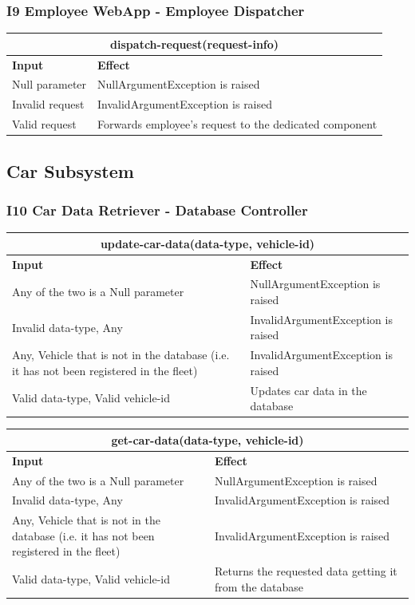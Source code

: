 \documentclass{article}
\begin{document}
\subsubsection{I9 Employee WebApp - Employee Dispatcher}
\begin{tabular}{ |p{5cm}|p{7cm}| }
  \hline
  \multicolumn{2}{|c|}{dispatch-request(request-info)} \\
  \hline
  \textbf{Input} & \textbf{Effect} \\
  \hline
  Null parameter & NullArgumentException is raised\\
  \hline
  Invalid request & InvalidArgumentException is raised \\
  \hline
  Valid request & Forwards employee's request to the dedicated component\\
  \hline
\end{tabular}
\newpage
\subsection{Car Subsystem}
\subsubsection{I10 Car Data Retriever - Database Controller}
\begin{tabular}{ |p{5cm}|p{7cm}| }
  \hline
  \multicolumn{2}{|c|}{update-car-data(data-type, vehicle-id)} \\
  \hline
  \textbf{Input} & \textbf{Effect} \\
  \hline
  Any of the two is a Null parameter & NullArgumentException is raised\\
  \hline
  Invalid data-type, Any & InvalidArgumentException is raised\\
  \hline
  Any, Vehicle that is not in the database (i.e. it has not been registered in the fleet) & InvalidArgumentException is raised\\
  \hline
   Valid data-type, Valid vehicle-id & Updates car data in the database\\
  \hline
\end{tabular}
\newline
\begin{tabular}{ |p{5cm}|p{7cm}| }
  \hline
  \multicolumn{2}{|c|}{get-car-data(data-type, vehicle-id)} \\
  \hline
  \textbf{Input} & \textbf{Effect} \\
  \hline
  Any of the two is a Null parameter & NullArgumentException is raised\\
  \hline
  Invalid data-type, Any & InvalidArgumentException is raised\\
  \hline
  Any, Vehicle that is not in the database (i.e. it has not been registered in the fleet) & InvalidArgumentException is raised\\
  \hline
   Valid data-type, Valid vehicle-id & Returns the requested data getting it from the database\\
  \hline
\end{tabular}
\end{document}
